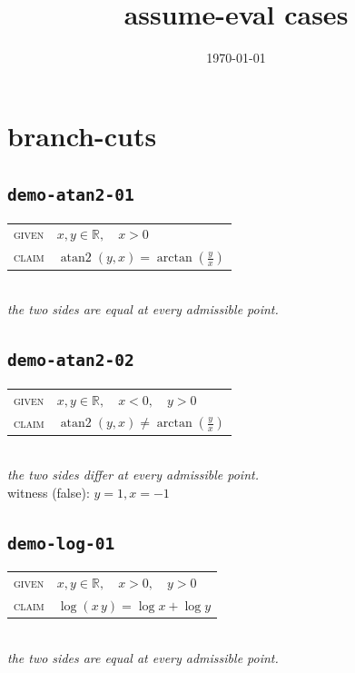 \documentclass[11pt]{article}
\title{assume-eval cases}
\date{\today}
\begin{document}
\maketitle
\section*{branch-cuts}
\subsection*{\texttt{demo-atan2-01}}
\begin{tabular}{@{}l@{\quad}l@{}}
\textsc{given} & $x, y \in \mathbb{R},\quad x > 0$ \\[4pt]
\textsc{claim} & $\displaystyle \operatorname{atan2}\left(y, x\right) = \arctan\left(\frac{y}{x}\right)$ \\
\end{tabular}\\[2pt]
{\small\emph{the two sides are equal at every admissible point.}}\\

\subsection*{\texttt{demo-atan2-02}}
\begin{tabular}{@{}l@{\quad}l@{}}
\textsc{given} & $x, y \in \mathbb{R},\quad x < 0,\quad y > 0$ \\[4pt]
\textsc{claim} & $\displaystyle \operatorname{atan2}\left(y, x\right) \neq \arctan\left(\frac{y}{x}\right)$ \\
\end{tabular}\\[2pt]
{\small\emph{the two sides differ at every admissible point.}}\\
{\footnotesize\color{gray}witness (false): $y = 1, x = -1$}\\

\subsection*{\texttt{demo-log-01}}
\begin{tabular}{@{}l@{\quad}l@{}}
\textsc{given} & $x, y \in \mathbb{R},\quad x > 0,\quad y > 0$ \\[4pt]
\textsc{claim} & $\displaystyle \log\left(x \, y\right) = \log x + \log y$ \\
\end{tabular}\\[2pt]
{\small\emph{the two sides are equal at every admissible point.}}\\
\end{document}
